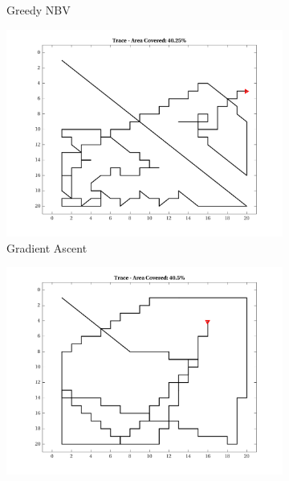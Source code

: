 \begin{figure}[htb!]
\begin{subfigure}[t]{0.3333\textwidth}
        \caption{Greedy NBV}
    \end{subfigure}%
    \begin{subfigure}[t]{0.3333\textwidth}
        \centering
        \includegraphics[width=\linewidth]{figures/hbresults/path_gradient_40p_20x20_sf_4_seed_2.png}
        \ssp
        \captionsetup{skip=0.20\baselineskip,size=footnotesize}
        \caption{Gradient Ascent}
    \end{subfigure}%
    \begin{subfigure}[t]{0.3333\textwidth}
        \centering
        \includegraphics[width=\linewidth]{figures/hbresults/path_gr_40p_20x20_sf_4_seed_2.png}
        \ssp
        \captionsetup{skip=0.20\baselineskip,size=footnotesize}

\end{subfigure}
\end{figure}
